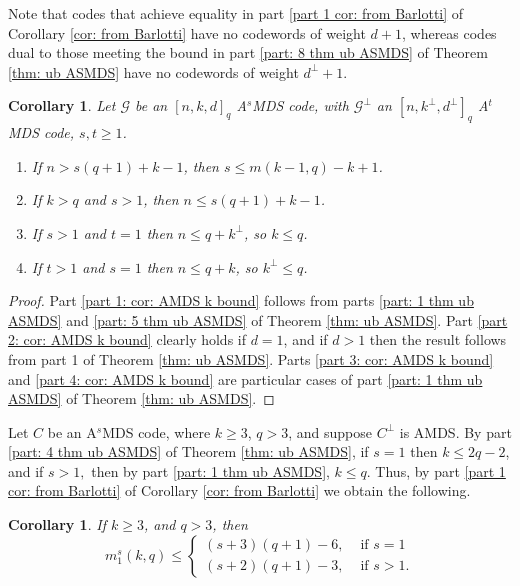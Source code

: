 \documentclass[11pt,a4paper]{amsart}
\newcommand{\AS}{ A$^s$MDS }
\newcommand{\G}{\mathcal{G}}
\theoremstyle{plain}
\newtheorem{corollary}[theorem]{Corollary}
\theoremstyle{definition}
\theoremstyle{remark}
\begin{document}
	Note that codes that achieve equality in part \ref{part 1 cor: from Barlotti} of Corollary \ref{cor: from Barlotti} have no codewords of weight $d+1$, whereas codes dual to those meeting the bound in part \ref{part: 8 thm ub ASMDS} of Theorem \ref{thm: ub ASMDS} have no codewords of weight $d^\perp +1$.

	\begin{corollary}\label{cor: AMDS k bound}  Let $\G$ be an $[n,k,d]_q$ \AS code, with  $\G^\perp$ an $[n,k^\perp,d^\perp]_q$ A$^t$MDS code,  $s, t\ge 1$.
		\begin{enumerate}
			\item If $n>s(q+1)+k-1$, then $s\le m(k-1,q)-k+1$. \label{part 1: cor: AMDS k bound}
			\item If $k> q$ and $s>1$, then  $n\le s(q+1)+k-1$. \label{part 2: cor: AMDS k bound}
			\item If $s>1$ and $t=1$ then $n\le q+k^\perp$, so $k\le q$. \label{part 3: cor: AMDS k bound}
			\item If $t>1$ and $s=1$ then $n\le q+k$, so $k^\perp \le q$. \label{part 4: cor: AMDS k bound}
		\end{enumerate}
	\end{corollary}
	\begin{proof}
		Part \ref{part 1: cor: AMDS k bound} follows from parts \ref{part: 1 thm ub ASMDS} and \ref{part: 5 thm ub ASMDS} of Theorem \ref{thm: ub ASMDS}. Part \ref{part 2: cor: AMDS k bound} clearly holds if $d=1$, and if $d>1$ then the result  follows from part 1 of Theorem  \ref{thm: ub ASMDS}. Parts  \ref{part 3: cor: AMDS k bound} and \ref{part 4: cor: AMDS k bound} are particular cases of part \ref{part: 1 thm ub ASMDS} of Theorem  \ref{thm: ub ASMDS}.
	\end{proof}

	Let $C$ be an \AS code, where $k\ge3$, $q>3$, and suppose $C^\perp$ is AMDS. By part \ref{part: 4 thm ub ASMDS} of Theorem \ref{thm: ub ASMDS}, if $s=1$ then $k\le 2q-2$, and if $s>1,$ then by part \ref{part: 1 thm ub ASMDS}, $k\le q$.  Thus, by part \ref{part 1 cor: from Barlotti} of Corollary \ref{cor: from Barlotti} we obtain the following.
	\begin{corollary} \label{cor: AMDS no k}
		If  $k\ge 3$, and $q>3$, then \[m^s_1(k,q)\le \left\{\begin{array}{ll}
			(s+3)(q+1)-6, & \text{ if } s=1\\
			(s+2)(q+1)-3, & \text{ if } s>1.
		\end{array}\right.\]
	\end{corollary}
\end{document}
